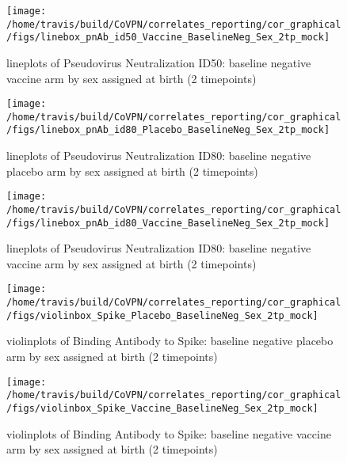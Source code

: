 \documentclass[]{book}
\theoremstyle{definition}
\theoremstyle{definition}
\theoremstyle{definition}
\newcommand{\1}{\mathbbm{1}}
\begin{document}
\clearpage
\begin{figure}[H]

{\centering \texttt{[image: /home/travis/build/CoVPN/correlates\_reporting/cor\_graphical/figs/linebox\_pnAb\_id50\_Vaccine\_BaselineNeg\_Sex\_2tp\_mock]} 

}

\caption{lineplots of Pseudovirus Neutralization ID50: baseline negative vaccine arm by sex assigned at birth (2 timepoints)}\label{fig:unnamed-chunk-160}
\end{figure}

\clearpage
\begin{figure}[H]

{\centering \texttt{[image: /home/travis/build/CoVPN/correlates\_reporting/cor\_graphical/figs/linebox\_pnAb\_id80\_Placebo\_BaselineNeg\_Sex\_2tp\_mock]} 

}

\caption{lineplots of Pseudovirus Neutralization ID80: baseline negative placebo arm by sex assigned at birth (2 timepoints)}\label{fig:unnamed-chunk-161}
\end{figure}

\clearpage
\begin{figure}[H]

{\centering \texttt{[image: /home/travis/build/CoVPN/correlates\_reporting/cor\_graphical/figs/linebox\_pnAb\_id80\_Vaccine\_BaselineNeg\_Sex\_2tp\_mock]} 

}

\caption{lineplots of Pseudovirus Neutralization ID80: baseline negative vaccine arm by sex assigned at birth (2 timepoints)}\label{fig:unnamed-chunk-162}
\end{figure}

\clearpage
\begin{figure}[H]

{\centering \texttt{[image: /home/travis/build/CoVPN/correlates\_reporting/cor\_graphical/figs/violinbox\_Spike\_Placebo\_BaselineNeg\_Sex\_2tp\_mock]} 

}

\caption{violinplots of Binding Antibody to Spike: baseline negative placebo arm by sex assigned at birth (2 timepoints)}\label{fig:unnamed-chunk-163}
\end{figure}

\clearpage
\begin{figure}[H]

{\centering \texttt{[image: /home/travis/build/CoVPN/correlates\_reporting/cor\_graphical/figs/violinbox\_Spike\_Vaccine\_BaselineNeg\_Sex\_2tp\_mock]} 

}

\caption{violinplots of Binding Antibody to Spike: baseline negative vaccine arm by sex assigned at birth (2 timepoints)}\label{fig:unnamed-chunk-164}
\end{figure}
\end{document}
